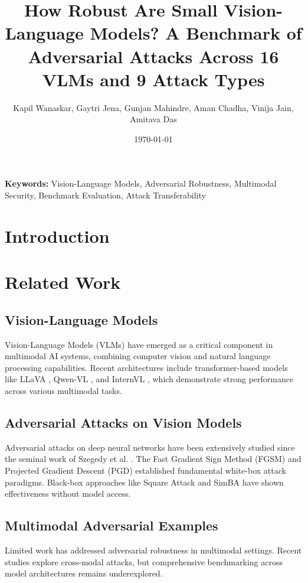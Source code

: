 \documentclass[10pt,twocolumn]{article}
\title{How Robust Are Small Vision-Language Models? A Benchmark of Adversarial Attacks Across 16 VLMs and 9 Attack Types}
\author{Kapil Wanaskar, Gaytri Jena, Gunjan Mahindre, Aman Chadha, Vinija Jain, Amitava Das}
\date{\today}
\begin{document}
\maketitle

\begin{abstract}

\end{abstract}

\noindent\textbf{Keywords:} Vision-Language Models, Adversarial Robustness, Multimodal Security, Benchmark Evaluation, Attack Transferability

\section{Introduction}


\section{Related Work}
\label{sec:related}

\subsection{Vision-Language Models}
Vision-Language Models (VLMs) have emerged as a critical component in multimodal AI systems, combining computer vision and natural language processing capabilities. Recent architectures include transformer-based models like LLaVA \cite{liu2023visual}, Qwen-VL \cite{bai2023qwen}, and InternVL \cite{chen2023internvl}, which demonstrate strong performance across various multimodal tasks.

\subsection{Adversarial Attacks on Vision Models}
Adversarial attacks on deep neural networks have been extensively studied since the seminal work of Szegedy et al. \cite{szegedy2013intriguing}. The Fast Gradient Sign Method (FGSM) \cite{goodfellow2014explaining} and Projected Gradient Descent (PGD) \cite{madry2017towards} established fundamental white-box attack paradigms. Black-box approaches like Square Attack \cite{andriushchenko2020square} and SimBA \cite{guo2019simple} have shown effectiveness without model access.

\subsection{Multimodal Adversarial Examples}
Limited work has addressed adversarial robustness in multimodal settings. Recent studies \cite{zhang2023multimodal, zhao2024adversarial} explore cross-modal attacks, but comprehensive benchmarking across model architectures remains underexplored.
\end{document}
